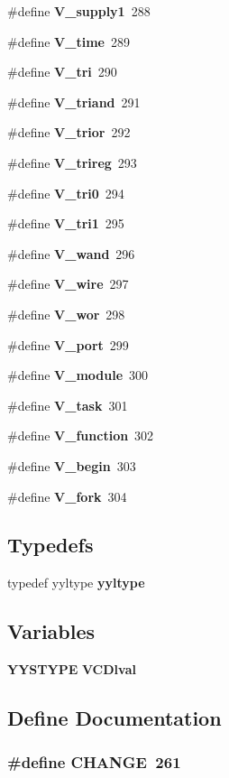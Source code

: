 \begin{CompactItemize}
\item 
\#define {\bf V\_\-supply1}\ 288
\item 
\#define {\bf V\_\-time}\ 289
\item 
\#define {\bf V\_\-tri}\ 290
\item 
\#define {\bf V\_\-triand}\ 291
\item 
\#define {\bf V\_\-trior}\ 292
\item 
\#define {\bf V\_\-trireg}\ 293
\item 
\#define {\bf V\_\-tri0}\ 294
\item 
\#define {\bf V\_\-tri1}\ 295
\item 
\#define {\bf V\_\-wand}\ 296
\item 
\#define {\bf V\_\-wire}\ 297
\item 
\#define {\bf V\_\-wor}\ 298
\item 
\#define {\bf V\_\-port}\ 299
\item 
\#define {\bf V\_\-module}\ 300
\item 
\#define {\bf V\_\-task}\ 301
\item 
\#define {\bf V\_\-function}\ 302
\item 
\#define {\bf V\_\-begin}\ 303
\item 
\#define {\bf V\_\-fork}\ 304
\end{CompactItemize}
\subsection*{Typedefs}
\begin{CompactItemize}
\item 
typedef yyltype {\bf yyltype}
\end{CompactItemize}
\subsection*{Variables}
\begin{CompactItemize}
\item 
{\bf YYSTYPE} {\bf VCDlval}
\end{CompactItemize}


\subsection{Define Documentation}
\subsubsection{\setlength{\rightskip}{0pt plus 5cm}\#define CHANGE\ 261}\label{vcd__parser_8h_a5}



